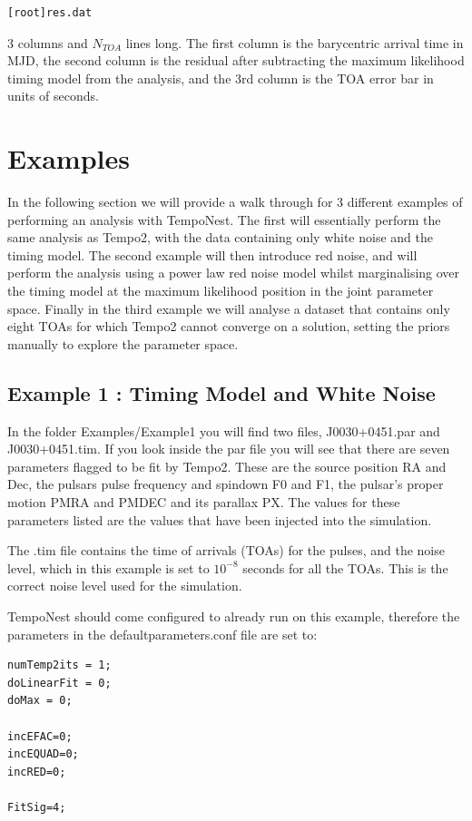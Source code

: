 \documentclass[%
 preprint,
 amsmath,amssymb,amsfonts,
 aps,
]{revtex4-1}
\begin{document}
\begin{lstlisting}
[root]res.dat
\end{lstlisting}
3 columns and $N_{TOA}$ lines long.  The first column is the barycentric arrival time in MJD, the second column is the residual after subtracting the maximum likelihood timing model from the analysis, and the 3rd column is the TOA error bar in units of seconds.


\section{Examples}
\label{Section:Example}

In the following section we will provide a walk through for 3 different examples of performing an analysis with TempoNest.  The first will essentially perform the same analysis as Tempo2, with the data containing only white noise and the timing model.  The second example will then introduce red noise, and will perform the analysis using a power law red noise model whilst marginalising over the timing model at the maximum likelihood position in the joint parameter space.  Finally in the third example we will analyse a dataset that contains only eight TOAs for which Tempo2 cannot converge on a solution, setting the priors manually to explore the parameter space.  


\subsection{Example 1 : Timing Model and White Noise}


In the folder Examples/Example1 you will find two files, J0030+0451.par and J0030+0451.tim.  If you look inside the par file you will see that there are seven parameters flagged to be fit by Tempo2.  These are the source position RA and Dec, the pulsars pulse frequency and spindown F0 and F1, the pulsar's proper motion PMRA and PMDEC and  its parallax PX.  The values for these parameters listed are the values that have been injected into the simulation.

The .tim file contains the time of arrivals (TOAs) for the pulses, and the noise level, which in this example is set to $10^{-8}$ seconds for all the TOAs.  This is the correct noise level used for the simulation.

TempoNest should come configured to already run on this example, therefore the parameters in the defaultparameters.conf file are set to:

\begin{lstlisting}
numTemp2its = 1;
doLinearFit = 0;
doMax = 0;

incEFAC=0;
incEQUAD=0;
incRED=0;

FitSig=4;
\end{lstlisting}
\end{document}
